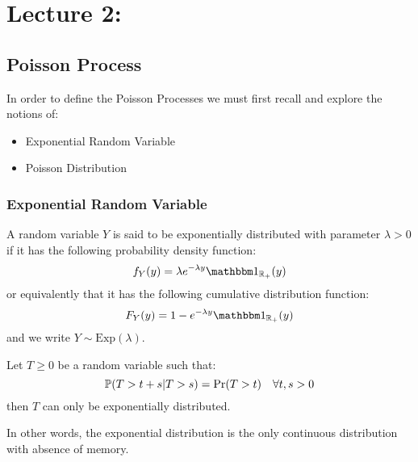 \chapter{Lecture 2: }

\section{Poisson Process}
In order to define the Poisson Processes we must first recall and explore the
notions of:
\begin{itemize}
    \item Exponential Random Variable
    \item Poisson Distribution
\end{itemize}

\subsection{Exponential Random Variable}
A random variable $Y$ is said to be exponentially distributed with parameter
$\lambda > 0$ if it has the following probability density function:
\[
    f_Y(y) = \lambda e^{-\lambda y} \I_{\Rpos}(y)
\]
or equivalently that it has the following cumulative distribution function:
\[
    F_Y(y) = 1 - e^{-\lambda y} \I_{\Rpos}(y)
\]
and we write $Y \sim \text{Exp}(\lambda)$.

\begin{theorem}
Let $T\geq0$ be a random variable such that:
\[ \P(T>t+s|T>s) = \Pr(T>t) \quad \forall t,s > 0 \]
then $T$ can only be exponentially distributed.
\end{theorem}

In other words, the exponential distribution is the only continuous distribution
with absence of memory.

